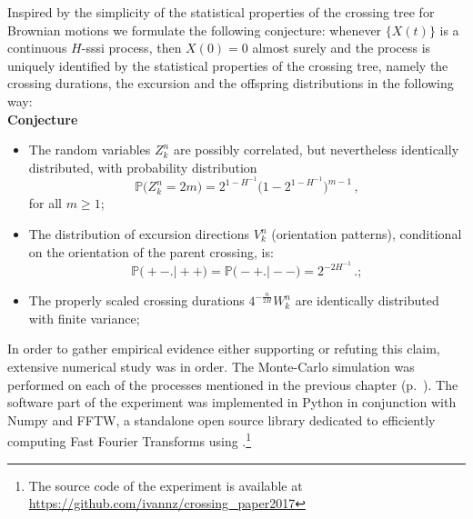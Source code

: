 \documentclass[a4paper]{article}
\newcommand{\pr}{\mathbb{P}}
\newcommand{\Dcal}{\mathcal{D}}
\begin{document}
Inspired by the simplicity of the statistical properties of the crossing tree for
Brownian motions we formulate the following conjecture: whenever $\{X(t)\}$ is a
continuous $H$-sssi process, then $X(0)= 0$ almost surely and the process is uniquely
identified by the statistical properties of the crossing tree, namely the crossing
durations, the excursion and the offspring distributions in the following way:\\
\noindent \textbf{Conjecture}\begin{itemize}
    \item The random variables $Z_k^n$ are possibly correlated, but nevertheless
    identically distributed, with probability distribution
    \[ \pr\bigl(Z_k^n=2m\bigr) = 2^{1-H^{-1}}\bigl(1-2^{1-H^{-1}}\bigr)^{m-1} \,,\]
    for all $m\geq 1$;
    \item The distribution of excursion directions $V_k^n$ (orientation patterns),
    conditional on the orientation of the parent crossing, is:
    \[ \pr\bigl( +- \bigr.\bigl\lvert ++ \bigr)
	= \pr\bigl( -+ \bigr.\bigl\lvert -- \bigr)
	= 2^{-2H^{-1}} \,.; \]
	\item The properly scaled crossing durations $4^{-\frac{n}{2H}} W_k^n$
	are identically distributed with finite variance;
\end{itemize}

In order to gather empirical evidence either supporting or refuting this claim,
extensive numerical study was in order. The Monte-Carlo simulation was performed
on each of the processes mentioned in the previous chapter (p.~\pageref{sec:self_sim_processes}).
The software part of the experiment was implemented in Python in conjunction with
Numpy and FFTW, a standalone open source library dedicated to efficiently computing
Fast Fourier Transforms using .\footnote{The source code of the experiment is available
at \url{https://github.com/ivannz/crossing_paper2017}}
\end{document}
